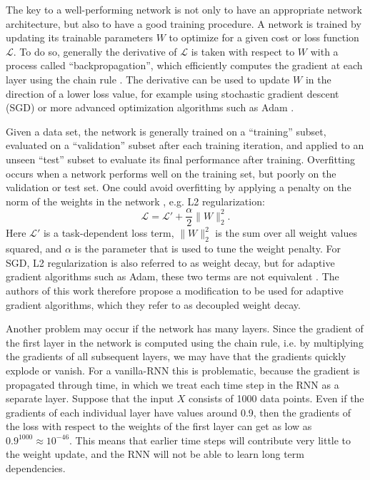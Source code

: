 The key to a well-performing network is not only to have an appropriate network architecture, but also to have a good training procedure. A network is trained by updating its trainable parameters $W$ to optimize for a given cost or loss function $\mathcal{L}$. To do so, generally the derivative of $\mathcal{L}$ is taken with respect to $W$ with a process called ``backpropagation'', which efficiently computes the gradient at each layer using the chain rule \citep{rumelhart1985learning}. The derivative can be used to update $W$ in the direction of a lower loss value, for example using stochastic gradient descent (SGD) or more advanced optimization algorithms such as Adam \citep{kingma2014adam}.

Given a data set, the network is generally trained on a ``training'' subset, evaluated on a ``validation'' subset after each training iteration, and applied to an unseen ``test'' subset to evaluate its final performance after training. Overfitting occurs when a network performs well on the training set, but poorly on the validation or test set. One could avoid overfitting by applying a penalty on the norm of the weights in the network \citep{krogh1992simple}, e.g. L2 regularization:
\begin{equation}
    \mathcal{L} = \mathcal{L'} + \frac{\alpha}{2} \|W\|_2^2.
\end{equation}
Here $\mathcal{L'}$ is a task-dependent loss term, $\|W\|_2^2$ is the sum over all weight values squared, and $\alpha$ is the parameter that is used to tune the weight penalty. For SGD, L2 regularization is also referred to as weight decay, but for adaptive gradient algorithms such as Adam, these two terms are not equivalent \citep{loshchilov2017decoupled}. The authors of this work therefore propose a modification to be used for adaptive gradient algorithms, which they refer to as decoupled weight decay.

Another problem may occur if the network has many layers. Since the gradient of the first layer in the network is computed using the chain rule, i.e. by multiplying the gradients of all subsequent layers, we may have that the gradients quickly explode or vanish. For a vanilla-RNN this is problematic, because the gradient is propagated through time, in which we treat each time step in the RNN as a separate layer. Suppose that the input $X$ consists of 1000 data points. Even if the gradients of each individual layer have values around 0.9, then the gradients of the loss with respect to the weights of the first layer can get as low as $0.9^{1000}\approx10^{-46}$. This means that earlier time steps will contribute very little to the weight update, and the RNN will not be able to learn long term dependencies.

